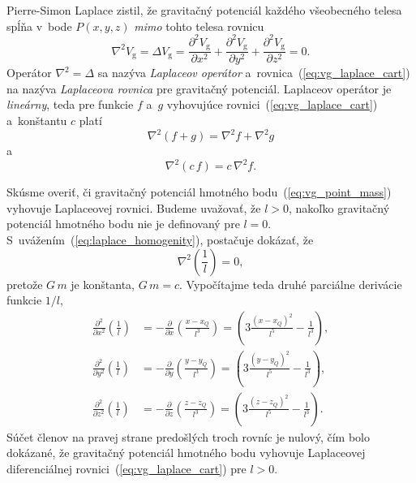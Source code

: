 \documentclass[a4paper, 12pt]{book}
\newcommand{\gidx}{\mathrm g}
\begin{document}
Pierre-Simon Laplace zistil, že gravitačný potenciál každého všeobecného telesa 
spĺňa v~bode $P(x, y, z)$ \emph{mimo} tohto telesa rovnicu
%
\begin{equation}
\label{eq:vg_laplace_cart}
\nabla^2 V_\gidx = \Delta V_\gidx = \frac{\partial^2 V_\gidx}{\partial x^2}
+ \frac{\partial^2 V_\gidx}{\partial y^2} + \frac{\partial^2 V_\gidx}{\partial 
z^2} = 0{.}
\end{equation}
%
Operátor $\nabla^2 = \Delta$ sa nazýva \emph{Laplaceov operátor} 
a~rovnica~(\ref{eq:vg_laplace_cart}) na nazýva \emph{Laplaceova rovnica} pre 
gravitačný potenciál.  Laplaceov operátor je \emph{lineárny}, teda pre funkcie 
$f$ a~$g$ vyhovujúce rovnici~(\ref{eq:vg_laplace_cart}) a~konštantu $c$ platí
%
\begin{equation}
\label{eq:laplace_additivity}
\nabla^2 \left(f + g \right) = \nabla^2 f + \nabla^2 g
\end{equation}
%
a
%
\begin{equation}
\label{eq:laplace_homogenity}
\nabla^2 (c \, f) = c \, \nabla^2 f{.}
\end{equation}

Skúsme overiť, či gravitačný potenciál hmotného bodu~(\ref{eq:vg_point_mass}) 
vyhovuje Laplaceovej rovnici.  Budeme uvažovať, že $l > 0$, nakoľko gravitačný 
potenciál hmotného bodu nie je definovaný pre $l = 0$.  
S~uvážením~(\ref{eq:laplace_homogenity}), postačuje dokázať, že
%
\begin{equation}
\label{eq:nabla_l}
\nabla^2 \left( \frac{1}{l} \right) = 0{,}
\end{equation}
%
pretože $G \, m$ je konštanta, $G \, m = c$.  Vypočítajme teda druhé parciálne 
derivácie funkcie $1 \slash l$,
%
\begin{equation}
\label{eq:l_2nd_derivatives}
\begin{split}
\frac{\partial^2}{\partial x^2} \left( \frac{1}{l} \right) &= 
-\frac{\partial}{\partial x} \left( \frac{x - x_Q}{l^3} \right) = \left(3 
\frac{(x - x_Q)^2}{l^5} - \frac{1}{l^3} \right){,}\\
%
\frac{\partial^2}{\partial y^2} \left( \frac{1}{l} \right) &= 
-\frac{\partial}{\partial y} \left( \frac{y - y_Q}{l^3} \right) = \left(3 
\frac{(y - y_Q)^2}{l^5} - \frac{1}{l^3} \right){,}\\
%
\frac{\partial^2}{\partial z^2} \left( \frac{1}{l} \right) &= 
-\frac{\partial}{\partial z} \left( \frac{z - z_Q}{l^3} \right) = \left(3 
\frac{(z - z_Q)^2}{l^5} - \frac{1}{l^3} \right){.}
\end{split}
\end{equation}
%
Súčet členov na pravej strane predošlých troch rovníc je nulový, čím bolo 
dokázané, že gravitačný potenciál hmotného bodu vyhovuje Laplaceovej 
diferenciálnej rovnici~(\ref{eq:vg_laplace_cart}) pre $l > 0$.
\end{document}
